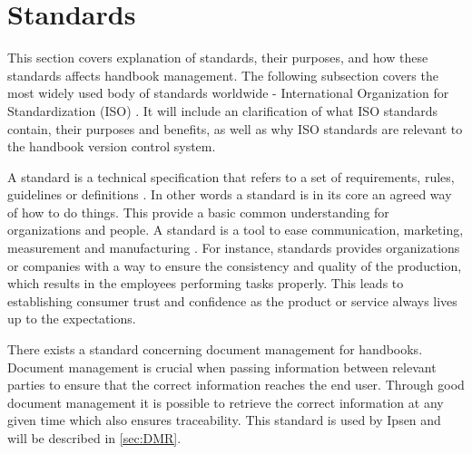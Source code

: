 \section{Standards} \label{sec:standards}
This section covers explanation of standards, their purposes, and how these standards affects handbook management.
The following subsection covers the most widely used body of standards worldwide - International Organization for Standardization (ISO) \cite{ISOworldwidemostused}.
It will include an clarification of what ISO standards contain, their purposes and benefits, as well as why ISO standards are relevant to the handbook version control system.

A standard is a technical specification that refers to a set of requirements, rules, guidelines or definitions \citep[p.~5]{Standard}.
In other words a standard is in its core an agreed way of how to do things.
This provide a basic common understanding for organizations and people.
A standard is a tool to ease communication, marketing, measurement and manufacturing \cite{Standardtool}.
For instance, standards provides organizations or companies with a way to ensure the consistency and quality of the production, which results in the employees performing tasks properly.
This leads to establishing consumer trust and confidence as the product or service always lives up to the expectations. \citep[p.~83]{Standardization}

There exists a standard concerning document management for handbooks.
Document management is crucial when passing information between relevant parties to ensure that the correct information reaches the end user.
Through good document management it is possible to retrieve the correct information at any given time which also ensures traceability.
This standard is used by Ipsen and will be described in \cref{sec:DMR}.

